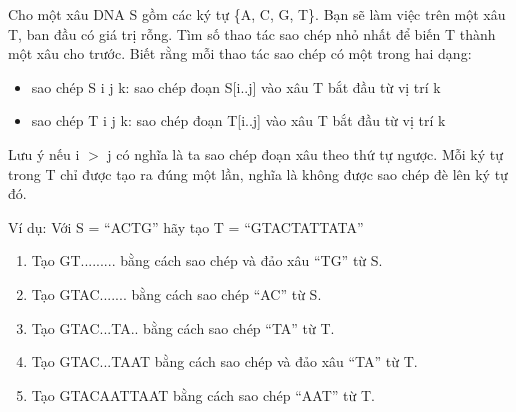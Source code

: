 Cho một xâu DNA S gồm các ký tự \{A, C, G, T\}. Bạn sẽ làm việc trên một xâu T, ban đầu có giá trị rỗng. Tìm số thao tác sao chép nhỏ nhất để biến T thành một xâu cho trước. Biết rằng mỗi thao tác sao chép có một trong hai dạng:  
\begin{itemize}
	\item     sao chép S i j k: sao chép đoạn S[i..j] vào xâu T bắt đầu từ vị trí k   
	\item     sao chép T i j k: sao chép đoạn T[i..j] vào xâu T bắt đầu từ vị trí k   
\end{itemize}

   Lưu ý nếu i $>$ j có nghĩa là ta sao chép đoạn xâu theo thứ tự ngược. Mỗi ký tự trong T chỉ được tạo ra đúng một lần, nghĩa là không được sao chép đè lên ký tự đó.  

   Ví dụ: Với S = “ACTG” hãy tạo T = “GTACTATTATA”  
\begin{enumerate}
	\item     Tạo GT......... bằng cách sao chép và đảo xâu “TG” từ S.   
	\item     Tạo GTAC....... bằng cách sao chép “AC” từ S.   
	\item     Tạo GTAC...TA.. bằng cách sao chép “TA” từ T.   
	\item     Tạo GTAC...TAAT bằng cách sao chép và đảo xâu “TA” từ T.   
	\item     Tạo GTACAATTAAT bằng cách sao chép “AAT” từ T.   
\end{enumerate}

\